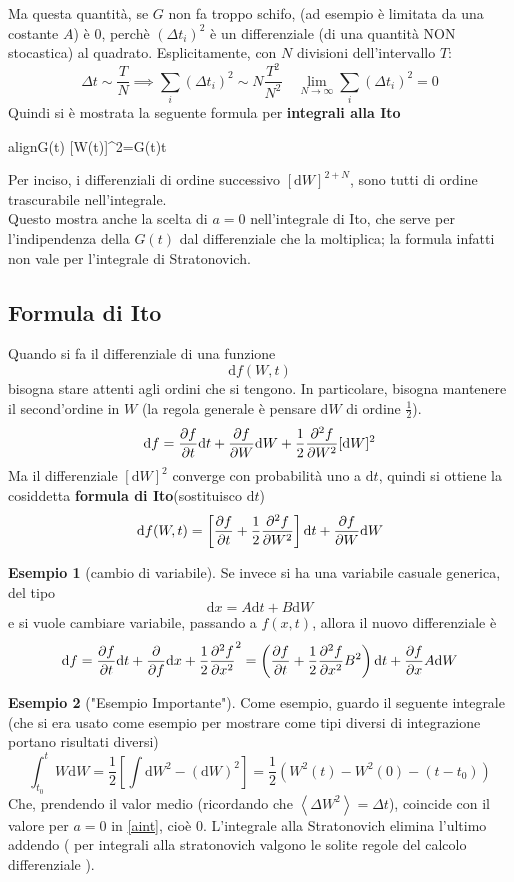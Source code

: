 \documentclass[a4paper,12pt]{article}
\newcommand{\boxedeq}[2]{\begin{empheq}[box={\fboxsep=6pt\fbox}]{align}\label{#1}#2\end{empheq}}
\theoremstyle{plain}
\theoremstyle{definition}
\newtheorem{exmp}{Esempio}[section]
\newcommand{\f}[2]{\frac{#1}{#2}}
\newcommand{\ave}[1]{\left\langle#1\right\rangle }
\renewcommand{\d}{\text{d}}
\newcommand{\ra}{\rightarrow}
\theoremstyle{remark}
\begin{document}
Ma questa quantità, se $G$ non fa troppo schifo, (ad esempio è limitata da una costante $A$) è 0, perchè $(\Delta t_i)^2$ è un differenziale (di una quantità NON stocastica) al quadrato. Esplicitamente, con $N$ divisioni dell'intervallo $T$:
\[\Delta t \sim\f{T}{N}\implies \sum_i \left(\Delta t_i\right)^2\sim N \f{T^2}{N^2}\quad \lim_{N\ra \infty}\sum_i \left(\Delta t_i\right)^2=0	\] 
Quindi si è mostrata la seguente formula per \textbf{integrali alla Ito}
\boxedeq{itomain}{\int G(t) [\d W(t)]^2=\int G(t)\d t}
Per inciso, i differenziali di ordine successivo $[\d W]^{2+N}$, sono tutti di ordine trascurabile nell'integrale.\\ Questo mostra anche la scelta di $a=0$ nell'integrale di Ito, che serve per l'indipendenza della $G(t)$ dal differenziale che la moltiplica; la formula infatti non vale per l'integrale di Stratonovich.\subsection{Formula di Ito}
Quando si fa il differenziale di una funzione 
\[\d f(W,t) 		\]
bisogna stare attenti agli ordini che si tengono. In particolare, bisogna mantenere il second'ordine in $W$ (la regola generale è pensare $\d W$ di ordine $\f{1}{2}$). 
\[\d f=\pdv{f}{t}\d t+\pdv{f}{W}\d W+\f{1}{2}\pdv[2]{f}{W} [\d W]^2		\]
Ma il differenziale $[\d W]^2$ converge con probabilità uno a $\d t$, quindi si ottiene la cosiddetta \textbf{formula di Ito}(sostituisco $\d t$)
\[\d f(W,t)=\left[\pdv{f}{t}+\f{1}{2}\pdv[2]{f}{W}\right]\d t+\pdv{f}{W}\d W\]
\begin{exmp} [cambio di variabile]
Se invece si ha una variabile casuale generica, del tipo
\[\d x	=A\d t+ B\d W	\]
e si vuole cambiare variabile, passando a $f(x,t)$, allora il nuovo differenziale  è
\[\d f=\pdv{f}{t}\d t+\pdv{f}\d x+\f{1}{2}\pdv[2]{f}{x}(\d x)^2=\left(\pdv{f}{t}+\f{1}{2}\pdv[2]{f}{x} B^2\right)\d t+\pdv{f}{x} A \d W		\]

\end{exmp}
\begin{exmp}["Esempio Importante"]
Come esempio, guardo il seguente integrale (che si era usato come esempio per mostrare come tipi diversi di integrazione portano risultati diversi)
\[\int_{t_0}^t 	W \d W=\f{1}{2}\left[\int \d W^2-(\d W)^2\right]=\f{1}{2}\left(W^2(t)- W^2(0)-(t-t_0)\right)			\]
Che, prendendo il valor medio (ricordando che $\ave{\Delta W^2}=\Delta t$), coincide con il valore per $a=0$ in \ref{aint}, cioè 0. L'integrale alla Stratonovich elimina l'ultimo addendo ( per integrali alla stratonovich valgono le solite regole del calcolo differenziale ).
\end{exmp}
\end{document}

